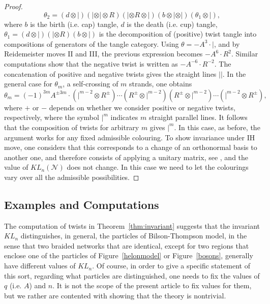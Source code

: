 \documentclass[aps,nofootinbib,amsfonts,superscriptaddress]{revtex4}
\begin{document}
\begin{proof}
\begin{equation}
   \theta_2 =  (d\otimes |)(|\otimes |\otimes R)(|\otimes R\otimes |)(b\otimes |\otimes |)(\theta_1 \otimes |),
\end{equation}
where $b$ is the birth (i.e. cap) tangle, $d$ is the death (i.e. cup) tangle,  $\theta_1 = (d\otimes |)(|\otimes R)(b\otimes |)$ is the decomposition of (positive) twist tangle into compositions of generators of the tangle category. Using $\theta = -A^3\cdot |$, and by Reidemeister moves II and III, the previous expression becomes $-A^6\cdot R^2$. Similar computations show that the negative twist is written as $-A^{-6}\cdot R^{-2}$. The concatenation of positive and negative twists gives the straight lines $||$. In the general case for $\theta_{m}$, a self-crossing of $m$ strands, one obtains
\begin{equation}
  \theta_{m} = (-1)^{3m}A^{\pm 3m} \cdot (|^{m-2}\otimes R^\pm)\cdots(R^\pm\otimes |^{m-2})(R^\pm\otimes |^{m-2})\cdots(|^{m-2}\otimes R^\pm),  
\end{equation}
where $+$ or $-$ depends on whether we consider positive or negative twists, respectively, where the symbol $|^m$ indicates $m$ straight parallel lines. It follows that the composition of twists for arbitrary $m$ gives $|^m$. In this case, as before, the argument works for any fixed admissible colouring. To show invariance under IH move, one considers that this corresponds to a change of an orthonormal basis to another one, and therefore consists of applying a unitary matrix, see \cite{Lick2}, and the value of $KL_{n}(\mathcal N)$ does not change. In this case we need to let the colourings vary over all the admissible possibilities. %
\end{proof}

\bigskip 

\subsection{Examples and Computations}

The computation of twists in Theorem~\ref{thm:invariant} suggests that the invariant $KL_n$ distinguishes, in general, the particles of Bilson-Thompson model, in the sense that two braided networks that are identical, except for two regions that enclose one of the particles of Figure~\ref{helonmodel} or Figure~\ref{bosons}, generally have different values of $KL_n$. Of course, in order to give a specific statement of this sort, regarding what particles are distinguished, one needs to fix the values of $q$ (i.e. $A$) and $n$. It is not the scope of the present article to fix values for them, but we rather are contented with showing that the theory is nontrivial. \\
\end{document}
